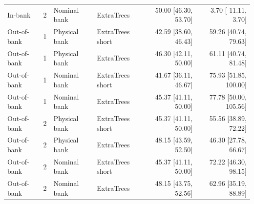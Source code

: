 \begin{table}[t]
\begin{tabular}{ll ll rr}
In-bank & 2 & Nominal bank & ExtraTrees & 50.00 [46.30, 53.70] & -3.70 [-11.11, 3.70]\\
Out-of-bank & 1 & Physical bank & ExtraTrees short & 42.59 [38.60, 46.43] & 59.26 [40.74, 79.63]\\
Out-of-bank & 1 & Physical bank & ExtraTrees & 46.30 [42.11, 50.00] & 61.11 [40.74, 81.48]\\
Out-of-bank & 1 & Nominal bank & ExtraTrees short & 41.67 [36.11, 46.67] & 75.93 [51.85, 100.00]\\
Out-of-bank & 1 & Nominal bank & ExtraTrees & 45.37 [41.11, 50.00] & 77.78 [50.00, 105.56]\\
Out-of-bank & 2 & Physical bank & ExtraTrees short & 45.37 [41.11, 50.00] & 55.56 [38.89, 72.22]\\
Out-of-bank & 2 & Physical bank & ExtraTrees & 48.15 [43.59, 52.50] & 46.30 [27.78, 66.67]\\
Out-of-bank & 2 & Nominal bank & ExtraTrees short & 45.37 [41.11, 50.00] & 72.22 [46.30, 98.15]\\
Out-of-bank & 2 & Nominal bank & ExtraTrees & 48.15 [43.75, 52.56] & 62.96 [35.19, 88.89]\\
\bottomrule\end{tabular}
\end{table}
